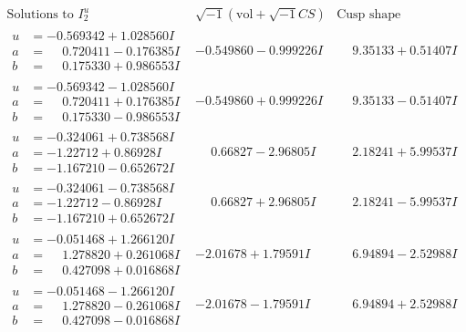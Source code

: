 \documentclass[1p]{elsarticle_modified}
\theoremstyle{definition}
\newcommand{\I}{\sqrt{-1}}
\begin{document}
$$\begin{array}{c|c|c}  
\text{Solutions to }I^u_{2}& \I (\text{vol} + \sqrt{-1}CS) & \text{Cusp shape}\\
 \hline 
\begin{aligned}
u &= -0.569342 + 1.028560 I \\
a &= \phantom{-}0.720411 - 0.176385 I \\
b &= \phantom{-}0.175330 + 0.986553 I\end{aligned}
 & -0.549860 - 0.999226 I & \phantom{-}9.35133 + 0.51407 I \\ \hline\begin{aligned}
u &= -0.569342 - 1.028560 I \\
a &= \phantom{-}0.720411 + 0.176385 I \\
b &= \phantom{-}0.175330 - 0.986553 I\end{aligned}
 & -0.549860 + 0.999226 I & \phantom{-}9.35133 - 0.51407 I \\ \hline\begin{aligned}
u &= -0.324061 + 0.738568 I \\
a &= -1.22712 + 0.86928 I \\
b &= -1.167210 - 0.652672 I\end{aligned}
 & \phantom{-}0.66827 - 2.96805 I & \phantom{-}2.18241 + 5.99537 I \\ \hline\begin{aligned}
u &= -0.324061 - 0.738568 I \\
a &= -1.22712 - 0.86928 I \\
b &= -1.167210 + 0.652672 I\end{aligned}
 & \phantom{-}0.66827 + 2.96805 I & \phantom{-}2.18241 - 5.99537 I \\ \hline\begin{aligned}
u &= -0.051468 + 1.266120 I \\
a &= \phantom{-}1.278820 + 0.261068 I \\
b &= \phantom{-}0.427098 + 0.016868 I\end{aligned}
 & -2.01678 + 1.79591 I & \phantom{-}6.94894 - 2.52988 I \\ \hline\begin{aligned}
u &= -0.051468 - 1.266120 I \\
a &= \phantom{-}1.278820 - 0.261068 I \\
b &= \phantom{-}0.427098 - 0.016868 I\end{aligned}
 & -2.01678 - 1.79591 I & \phantom{-}6.94894 + 2.52988 I \\ \hline\begin{aligned}

\end{aligned}
\end{array}$$
\end{document}
